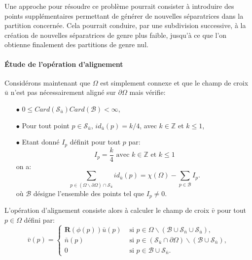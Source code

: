 Une approche pour résoudre ce problème pourrait consister à introduire des points supplémentaires permettant de générer de nouvelles séparatrices dans la partition concernée. Cela pourrait conduire, par une subdivision successive, à la création de nouvelles séparatrices de genre plus faible, jusqu'à ce que l'on obtienne finalement des partitions de genre nul.



\paragraph{\'Etude de l'opération d'alignement}

Considérons maintenant que $\Omega$ est simplement connexe et que le champ de croix $\bar{u}$ n'est pas nécessairement aligné sur $\partial\Omega$ mais vérifie:
\begin{itemize}
 \item[$\bullet$] $0\leq Card(\mathcal{S}_{\bar{u}})Card(\mathcal{B})<\infty$,\\
 \item[$\bullet$] Pour tout point $p\in\mathcal{S}_{\bar{u}}$, $id_{\bar{u}}(p)=k/4$, avec $k\in\mathbb{Z}$ et $k\leq 1$,\\
 \item[$\bullet$] Etant donné $I_p$ définit pour tout $p$ par:
\begin{equation}
I_p=\displaystyle\frac{k}{4}\mbox{ avec }k\in\mathbb{Z}\mbox{ et }k\leq 1
\end{equation}
on a:
 \begin{equation}
    \label{eqn:principe_hypothese_u_space}
    \sum_{p\in(\Omega\backslash\partial\Omega)\cap\mathcal{S}_{\bar{u}}}id_{\bar{u}}(p)=\chi(\Omega)-\sum_{p\in\mathcal{B}}I_p.
\end{equation}
où $\mathcal{B}$ désigne l'ensemble des points tel que $I_p\neq 0$.\\
\end{itemize}
L'opération d'alignement consiste alors à calculer le champ de croix $\bar{v}$ pour tout $p\in\Omega$ défini par:
\begin{equation}
\bar{v}(p)=
\left\{
\begin{array}{ll}
\mathbf{R}(\phi(p))\bar{u}(p) & \mbox{ si } p\in\Omega\backslash(\mathcal{B}\cup\mathcal{S}_{\bar{n}}\cup\mathcal{S}_{\bar{u}}),\\[0.5cm]
\bar{n}(p) & \mbox{ si } p\in(\mathcal{S}_{\bar{u}}\cap\partial\Omega)\backslash(\mathcal{B}\cup\mathcal{S}_{\bar{n}}),\\[0.5cm]
0 & \mbox{ si } p\in\mathcal{B}\cup\mathcal{S}_{\bar{n}}.
\end{array}
\right.
\label{eqn:principe_def_v_space}
\end{equation}
